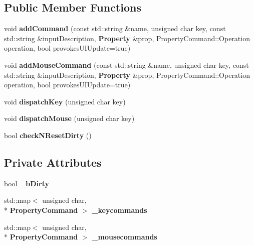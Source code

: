 \subsection*{Public Member Functions}
\begin{DoxyCompactItemize}
\item 
void {\bfseries add\-Command} (const std\-::string \&name, unsigned char key, const std\-::string \&input\-Description, {\bf Property} \&prop, Property\-Command\-::\-Operation operation, bool provokes\-U\-I\-Update=true)\label{classSoundfieldViewer_1_1CommandManager_a058567e1cd6d6ccf98d8e69e14ad9a1a}

\item 
void {\bfseries add\-Mouse\-Command} (const std\-::string \&name, unsigned char key, const std\-::string \&input\-Description, {\bf Property} \&prop, Property\-Command\-::\-Operation operation, bool provokes\-U\-I\-Update=true)\label{classSoundfieldViewer_1_1CommandManager_a1463bf97d67508c9568cee48fdeaf0d7}

\item 
void {\bfseries dispatch\-Key} (unsigned char key)\label{classSoundfieldViewer_1_1CommandManager_ac046a9f696fd0557951e6ff9f57c9221}

\item 
void {\bfseries dispatch\-Mouse} (unsigned char key)\label{classSoundfieldViewer_1_1CommandManager_ab800dd749404d0bc139710afbb9911c5}

\item 
bool {\bfseries check\-N\-Reset\-Dirty} ()\label{classSoundfieldViewer_1_1CommandManager_a8b49cc80d63417bb95828cd487d080a8}

\end{DoxyCompactItemize}
\subsection*{Private Attributes}
\begin{DoxyCompactItemize}
\item 
bool {\bfseries \-\_\-b\-Dirty}\label{classSoundfieldViewer_1_1CommandManager_a7c77651095ca1ad57a3762e41797196f}

\item 
std\-::map$<$ unsigned char, \\*
{\bf Property\-Command} $>$ {\bfseries \-\_\-keycommands}\label{classSoundfieldViewer_1_1CommandManager_a230bda33b01ef978cfc7f817b7e0670e}

\item 
std\-::map$<$ unsigned char, \\*
{\bf Property\-Command} $>$ {\bfseries \-\_\-mousecommands}\label{classSoundfieldViewer_1_1CommandManager_a8ec042b6f37989d9f65a87758ef14795}

\end{DoxyCompactItemize}


